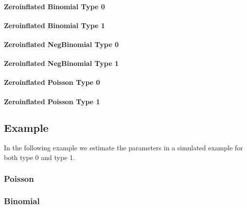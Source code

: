 \documentclass[a4paper,11pt]{article}
\begin{document}
\paragraph{Zeroinflated Binomial Type 0}


\paragraph{Zeroinflated Binomial Type 1}


\paragraph{Zeroinflated NegBinomial Type 0}


\paragraph{Zeroinflated NegBinomial Type 1}


\paragraph{Zeroinflated Poisson Type 0}


\paragraph{Zeroinflated Poisson Type 1}




\subsection*{Example}

In the following example we estimate the parameters in a simulated
example for both type 0 and type 1.
\subsubsection*{Poisson}



\subsubsection*{Binomial}
\end{document}
